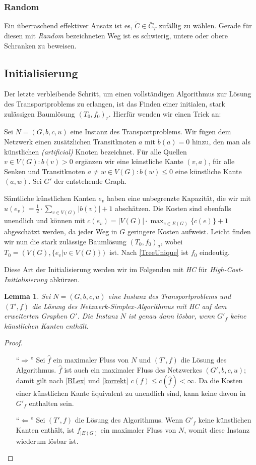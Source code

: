 \documentclass[a4paper,twoside,ngerman]{report}
\theoremstyle{plain}
\newtheorem{lem}[thm]{Lemma}
\theoremstyle{definition}
\begin{document}
\subsubsection{Random}
Ein überraschend effektiver Ansatz ist es, $\tilde{C}\in \bar{C}_T$ zufällig zu wählen. Gerade für diesen mit \emph{Random} bezeichneten Weg ist es schwierig, untere oder obere Schranken zu beweisen.

\subsection{Initialisierung} \label{ch:init}
Der letzte verbleibende Schritt, um einen vollständigen Algorithmus zur Lösung des Transportproblems zu erlangen, ist das Finden einer initialen, stark zulässigen Baumlösung $(T_0,f_0)_r$. Hierfür wenden wir einen Trick an:

Sei $N=(G,b,c,u)$ eine Instanz des Transportproblems. Wir fügen dem Netzwerk einen zusätzlichen Transitknoten $a$ mit $b(a)=0$ hinzu, den man als künstlichen \textit{(artificial)} Knoten bezeichnet. Für alle Quellen $v\in V(G):b(v)>0$ ergänzen wir eine künstliche Kante $(v,a)$, für alle Senken und Transitknoten $a\neq w\in V(G):b(w)\leq0$ eine künstliche Kante $(a,w)$. Sei $G'$ der entstehende Graph.

Sämtliche künstlichen Kanten $e_v$ haben eine unbegrenzte Kapazität, die wir mit $u(e_v)=\frac{1}{2}\cdot\sum_{v\in V(G)} |b(v)| + 1$ abschätzen. Die Kosten sind ebenfalls unendlich und können mit $c(e_v)=|V(G)|\cdot\max_{e\in E(G)}\{c(e)\}+1$ abgeschätzt werden, da jeder Weg in $G$ geringere Kosten aufweist. Leicht finden wir nun die stark zulässige Baumlösung $(T_0,f_0)_a$, wobei $T_0=(V(G),\{e_v|v\in V(G)\})$ ist. Nach \cref{TreeUnique} ist $f_0$ eindeutig.

Diese Art der Initialisierung werden wir im Folgenden mit \emph{HC} für \emph{High-Cost-Initialisierung} abkürzen.

\begin{lem}Sei $N=(G,b,c,u)$ eine Instanz des Transportproblems und $(T',f)$ die Lösung des Netzwerk-Simplex-Algorithmus mit \emph{HC} auf dem erweiterten Graphen $G'$. Die Instanz $N$ ist genau dann lösbar, wenn $G'_f$ keine künstlichen Kanten enthält.\end{lem}
\begin{proof}\label{solvable}\mbox{}
\begin{itemize}[topsep=0pt]
	\item[\enquote{$\Rightarrow$}] Sei $\hat{f}$ ein maximaler Fluss von $N$ und $(T',f)$ die Lösung des Algorithmus. $\hat{f}$ ist auch ein maximaler Fluss des Netzwerkes $(G',b,c,u)$; damit gilt nach \cref{BLex} und \cref{korrekt} $c(f)\leq c(\hat{f})<\infty$. Da die Kosten einer künstlichen Kante äquivalent zu unendlich sind, kann keine davon in $G'_f$ enthalten sein.
	
	\item[\enquote{$\Leftarrow$}] Sei $(T',f)$ die Lösung des Algorithmus. Wenn $G'_f$ keine künstlichen Kanten enthält, ist $f_{|E(G)}$ ein maximaler Fluss von $N$, womit diese Instanz wiederum lösbar ist.\qedhere
\end{itemize}
\end{proof}
\end{document}
